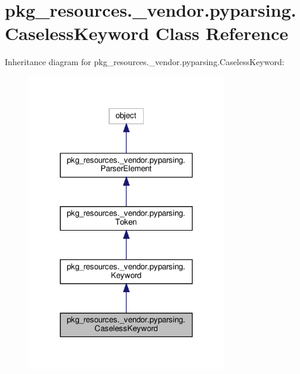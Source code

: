 \hypertarget{classpkg__resources_1_1__vendor_1_1pyparsing_1_1CaselessKeyword}{}\section{pkg\+\_\+resources.\+\_\+vendor.\+pyparsing.\+Caseless\+Keyword Class Reference}
\label{classpkg__resources_1_1__vendor_1_1pyparsing_1_1CaselessKeyword}


Inheritance diagram for pkg\+\_\+resources.\+\_\+vendor.\+pyparsing.\+Caseless\+Keyword\+:
\nopagebreak
\begin{figure}[H]
\begin{center}
\leavevmode
\includegraphics[width=246pt]{classpkg__resources_1_1__vendor_1_1pyparsing_1_1CaselessKeyword__inherit__graph}
\end{center}
\end{figure}


